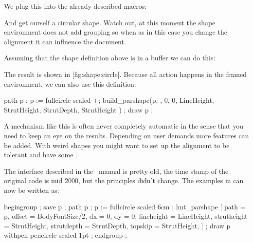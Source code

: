 \typebuffer[option=TEX]

\start \getbuffer \stop

We plug this into the already described macros:

\startbuffer
\startshapedparagraph[list=circle,mp=circle]%
\stopshapedparagraph
\stopbuffer

\typebuffer[option=TEX]

And get ourself a circular shape. Watch out, at this moment the shape environment
does not add grouping so when as in this case you change the alignment it can
influence the document.

\start \getbuffer \stop

\startbuffer[framed]
\framed[align=normal,width=\textwidth,offset=2mm,strut=no]\bgroup
    \getbuffer
\egroup
\stopbuffer

Assuming that the shape definition above is in a buffer we can do this:

\typebuffer[option=TEX]

The result is shown in  [fig:shape:circle]. Because all action
happens in the framed environment, we can also use this definition:

\starttyping[option=TEX]
    path p ; p := fullcircle scaled \the\dimexpr\framedwidth+\relax ;
    build_parshape(p,
        \framedoffset, 0, 0,
        LineHeight, StrutHeight, StrutDepth, StrutHeight
    ) ;
    draw p ;
\stopuseMPgraphic
\stoptyping

\startplacefigure[title=A framed circular shape,reference=fig:shape:circle]
    \getbuffer[framed]
\stopplacefigure

A mechanism like this is often never completely automatic in the sense that you
need to keep an eye on the results. Depending on user demands more features can
be added. With weird shapes you might want to set up the alignment to be \type
{tolerant} and have some .

The interface described in the \METAFUN\ manual is pretty old, the time stamp of
the original code is mid 2000, but the principles didn't change. The examples in
 can now be written as:

  begingroup ;
    save p ; path p ; p := fullcircle scaled 6cm ;
    lmt_parshape [
        path        = p,
        offset      = BodyFontSize/2,
        dx          = 0,           %
        dy          = 0,           %
        lineheight  = LineHeight,  %
        strutheight = StrutHeight, %
        strutdepth  = StrutDepth,  %
        topskip     = StrutHeight, %
    ] ;
    draw p withpen pencircle scaled 1pt ;
  endgroup ;
\stopuseMPgraphic


